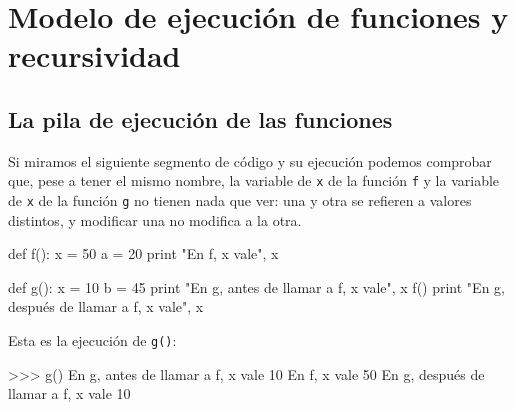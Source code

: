 
%

\chapter{Modelo de ejecución de funciones y recursividad}

\section{La pila de ejecución de las funciones}


Si miramos el siguiente segmento de código y su ejecución podemos comprobar
que, pese a tener el mismo nombre, la variable de \lstinline!x! de la función
\lstinline!f! y la variable de \lstinline!x! de la función \lstinline!g! no
tienen nada que ver: una y otra se refieren a valores distintos, y modificar
una no modifica a la otra.

\begin{codigo-python-sn}
def f():
    x = 50
    a = 20
    print "En f, x vale", x

def g():
    x = 10
    b = 45
    print "En g, antes de llamar a f, x vale", x
    f()
    print "En g, después de llamar a f, x vale", x
\end{codigo-python-sn}

Esta es la ejecución de \lstinline!g()!:

\begin{codigo-python-sn}
>>> g()
En g, antes de llamar a f, x vale 10
En f, x vale 50
En g, después de llamar a f, x vale 10
\end{codigo-python-sn}

